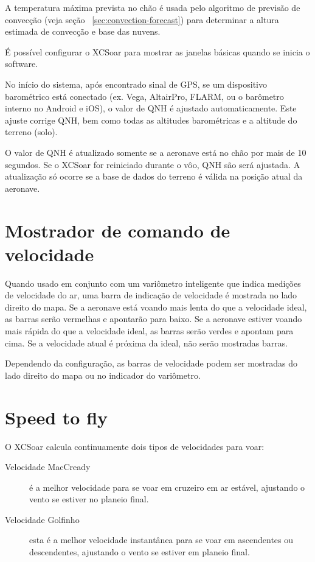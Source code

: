 A temperatura máxima prevista no chão é usada pelo algoritmo de previsão de convecção (veja seção ~\ref{sec:convection-forecast}) para determinar a altura estimada de convecção e base das nuvens.

\tip É possível configurar o XCSoar para mostrar as janelas básicas quando se inicia o software.

No início do sistema, após encontrado sinal de GPS, se um dispositivo barométrico está conectado (ex. Vega, AltairPro, FLARM, ou o barômetro interno no Android e iOS), o valor de QNH é ajustado automaticamente.  Este ajuste corrige QNH, bem como todas as altitudes barométricas e a altitude do terreno (solo).

O valor de QNH é atualizado somente se a aeronave está no chão por mais de 10 segundos.  Se o XCSoar for reiniciado durante o vôo, QNH são será ajustada.   A atualização só ocorre se a base de dados do terreno é válida na posição atual da aeronave.

\section{Mostrador de comando de velocidade}

Quando usado em conjunto com um variômetro inteligente que indica medições de velocidade do ar, uma barra de indicação de velocidade é mostrada no lado direito do mapa.  Se a aeronave está voando mais lenta do que a velocidade ideal, as barras serão vermelhas e apontarão para baixo.  Se a aeronave estiver voando mais rápida do que a velocidade ideal, as barras serão verdes e apontam para cima.  Se a velocidade atual é próxima da ideal, não serão mostradas barras.


Dependendo da configuração, as barras de velocidade podem ser mostradas do lado direito do mapa ou no indicador do variômetro. 

\section{Speed to fly}\label{sec:stf}

O XCSoar calcula continuamente dois tipos de velocidades para voar:
\begin{description}
\item[Velocidade MacCready]  é a melhor velocidade para se voar em cruzeiro em ar estável, ajustando o vento se estiver no planeio final.
\item[Velocidade Golfinho]  esta é a melhor velocidade instantânea para se voar em ascendentes ou descendentes, ajustando o vento se estiver em planeio final.
\end{description}  


